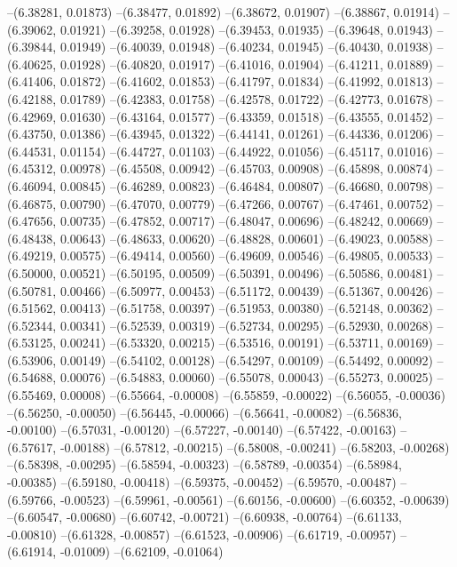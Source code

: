 --(6.38281, 0.01873)
--(6.38477, 0.01892)
--(6.38672, 0.01907)
--(6.38867, 0.01914)
--(6.39062, 0.01921)
--(6.39258, 0.01928)
--(6.39453, 0.01935)
--(6.39648, 0.01943)
--(6.39844, 0.01949)
--(6.40039, 0.01948)
--(6.40234, 0.01945)
--(6.40430, 0.01938)
--(6.40625, 0.01928)
--(6.40820, 0.01917)
--(6.41016, 0.01904)
--(6.41211, 0.01889)
--(6.41406, 0.01872)
--(6.41602, 0.01853)
--(6.41797, 0.01834)
--(6.41992, 0.01813)
--(6.42188, 0.01789)
--(6.42383, 0.01758)
--(6.42578, 0.01722)
--(6.42773, 0.01678)
--(6.42969, 0.01630)
--(6.43164, 0.01577)
--(6.43359, 0.01518)
--(6.43555, 0.01452)
--(6.43750, 0.01386)
--(6.43945, 0.01322)
--(6.44141, 0.01261)
--(6.44336, 0.01206)
--(6.44531, 0.01154)
--(6.44727, 0.01103)
--(6.44922, 0.01056)
--(6.45117, 0.01016)
--(6.45312, 0.00978)
--(6.45508, 0.00942)
--(6.45703, 0.00908)
--(6.45898, 0.00874)
--(6.46094, 0.00845)
--(6.46289, 0.00823)
--(6.46484, 0.00807)
--(6.46680, 0.00798)
--(6.46875, 0.00790)
--(6.47070, 0.00779)
--(6.47266, 0.00767)
--(6.47461, 0.00752)
--(6.47656, 0.00735)
--(6.47852, 0.00717)
--(6.48047, 0.00696)
--(6.48242, 0.00669)
--(6.48438, 0.00643)
--(6.48633, 0.00620)
--(6.48828, 0.00601)
--(6.49023, 0.00588)
--(6.49219, 0.00575)
--(6.49414, 0.00560)
--(6.49609, 0.00546)
--(6.49805, 0.00533)
--(6.50000, 0.00521)
--(6.50195, 0.00509)
--(6.50391, 0.00496)
--(6.50586, 0.00481)
--(6.50781, 0.00466)
--(6.50977, 0.00453)
--(6.51172, 0.00439)
--(6.51367, 0.00426)
--(6.51562, 0.00413)
--(6.51758, 0.00397)
--(6.51953, 0.00380)
--(6.52148, 0.00362)
--(6.52344, 0.00341)
--(6.52539, 0.00319)
--(6.52734, 0.00295)
--(6.52930, 0.00268)
--(6.53125, 0.00241)
--(6.53320, 0.00215)
--(6.53516, 0.00191)
--(6.53711, 0.00169)
--(6.53906, 0.00149)
--(6.54102, 0.00128)
--(6.54297, 0.00109)
--(6.54492, 0.00092)
--(6.54688, 0.00076)
--(6.54883, 0.00060)
--(6.55078, 0.00043)
--(6.55273, 0.00025)
--(6.55469, 0.00008)
--(6.55664, -0.00008)
--(6.55859, -0.00022)
--(6.56055, -0.00036)
--(6.56250, -0.00050)
--(6.56445, -0.00066)
--(6.56641, -0.00082)
--(6.56836, -0.00100)
--(6.57031, -0.00120)
--(6.57227, -0.00140)
--(6.57422, -0.00163)
--(6.57617, -0.00188)
--(6.57812, -0.00215)
--(6.58008, -0.00241)
--(6.58203, -0.00268)
--(6.58398, -0.00295)
--(6.58594, -0.00323)
--(6.58789, -0.00354)
--(6.58984, -0.00385)
--(6.59180, -0.00418)
--(6.59375, -0.00452)
--(6.59570, -0.00487)
--(6.59766, -0.00523)
--(6.59961, -0.00561)
--(6.60156, -0.00600)
--(6.60352, -0.00639)
--(6.60547, -0.00680)
--(6.60742, -0.00721)
--(6.60938, -0.00764)
--(6.61133, -0.00810)
--(6.61328, -0.00857)
--(6.61523, -0.00906)
--(6.61719, -0.00957)
--(6.61914, -0.01009)
--(6.62109, -0.01064)
